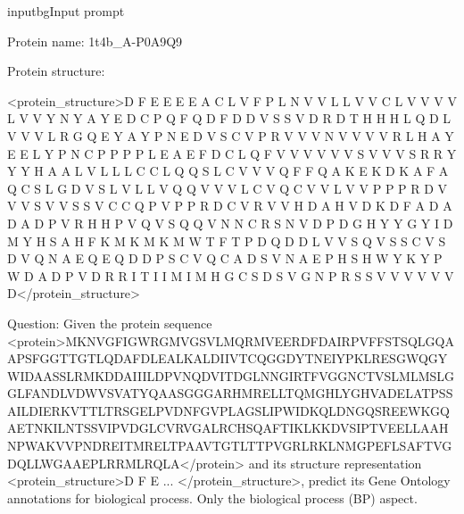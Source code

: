 \begin{appendices}
 

 

 

 

 

 

 

 

 
 
 
 

 

 
 
 
 
 

\label{fig:full-cot-example}

 

\clearpage

\begin{fullcotsection}{inputbg}{Input prompt}

\begin{cotverbatim}

Protein name: 1t4b_A-P0A9Q9

Protein structure: 

<protein_structure>D F E E E E A C L V F P L N V V L L V V C L V V V V L V V Y N Y A Y E D C P Q F Q D F D D V S S V D R D T H H H L Q D L V V V L R G Q E Y A Y P N E D V S C V P R V V V N V V V V R L H A Y E E L Y P N C P P P P L E A E F D C L Q F V V V V V V S V V V S R R Y Y Y H A A L V L L L C C L Q Q S L C V V V Q F F Q A K E K D K A F A Q C S L G D V S L V L L V Q Q V V V L C V Q C V V L V V P P P R D V V V S V V S S V C C Q P V P P R D C V R V V H D A H V D K D F A D A D A D P V R H H P V Q V S Q Q V N N C R S N V D P D G H Y Y G Y I D M Y H S A H F K M K M K M W T F T P D Q D D L V V S Q V S S C V S D V Q N A E Q E Q D D P S C V Q C A D S V N A E P H S H W Y K Y P W D A D P V D R R I T I I M I M H G C S D S V G N P R S S V V V V V V D</protein_structure>

Question: 
Given the protein sequence <protein>MKNVGFIGWRGMVGSVLMQRMVEERDFDAIRPVFFSTSQLGQAAPSFGGTTGTLQDAFDLEALKALDIIVTCQGGDYTNEIYPKLRESGWQGYWIDAASSLRMKDDAIIILDPVNQDVITDGLNNGIRTFVGGNCTVSLMLMSLGGLFANDLVDWVSVATYQAASGGGARHMRELLTQMGHLYGHVADELATPSSAILDIERKVTTLTRSGELPVDNFGVPLAGSLIPWIDKQLDNGQSREEWKGQAETNKILNTSSVIPVDGLCVRVGALRCHSQAFTIKLKKDVSIPTVEELLAAHNPWAKVVPNDREITMRELTPAAVTGTLTTPVGRLRKLNMGPEFLSAFTVGDQLLWGAAEPLRRMLRQLA</protein> and its structure representation <protein_structure>D F E ... </protein_structure>, predict its Gene Ontology annotations for biological process. Only the biological process (BP) aspect.


\end{cotverbatim}
\end{fullcotsection}
\end{appendices}
